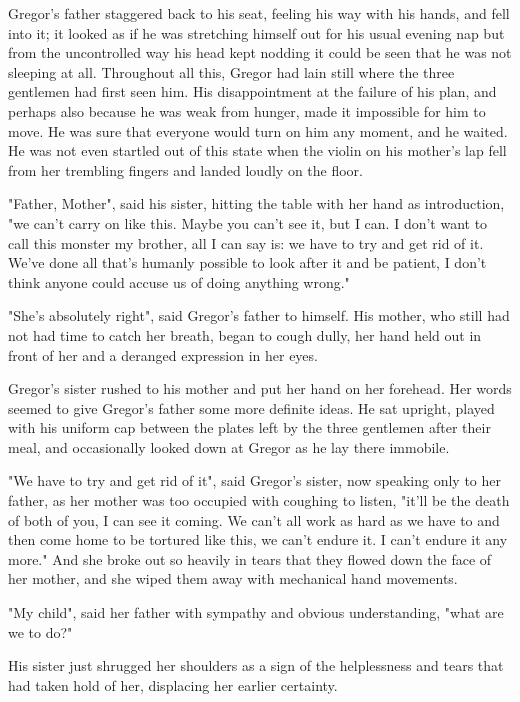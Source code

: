 Gregor's father staggered back to his seat, feeling his way with his hands, and fell into it; it looked as if he was stretching himself out for his usual evening nap but from the uncontrolled way his head kept nodding it could be seen that he was not sleeping at all. Throughout all this, Gregor had lain still where the three gentlemen had first seen him. His disappointment at the failure of his plan, and perhaps also because he was weak from hunger, made it impossible for him to move. He was sure that everyone would turn on him any moment, and he waited. He was not even startled out of this state when the violin on his mother's lap fell from her trembling fingers and landed loudly on the floor.

"Father, Mother", said his sister, hitting the table with her hand as introduction, "we can't carry on like this. Maybe you can't see it, but I can. I don't want to call this monster my brother, all I can say is: we have to try and get rid of it. We've done all that's humanly possible to look after it and be patient, I don't think anyone could accuse us of doing anything wrong."

"She's absolutely right", said Gregor's father to himself. His mother, who still had not had time to catch her breath, began to cough dully, her hand held out in front of her and a deranged expression in her eyes.

Gregor's sister rushed to his mother and put her hand on her forehead. Her words seemed to give Gregor's father some more definite ideas. He sat upright, played with his uniform cap between the plates left by the three gentlemen after their meal, and occasionally looked down at Gregor as he lay there immobile.

"We have to try and get rid of it", said Gregor's sister, now speaking only to her father, as her mother was too occupied with coughing to listen, "it'll be the death of both of you, I can see it coming. We can't all work as hard as we have to and then come home to be tortured like this, we can't endure it. I can't endure it any more." And she broke out so heavily in tears that they flowed down the face of her mother, and she wiped them away with mechanical hand movements.

"My child", said her father with sympathy and obvious understanding, "what are we to do?"

His sister just shrugged her shoulders as a sign of the helplessness and tears that had taken hold of her, displacing her earlier certainty.

